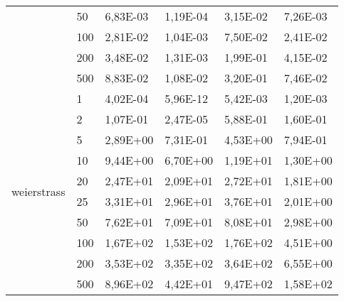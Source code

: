\begin{longtable}[c]{|p{3.5cm}|l|l|l|l|l|}
                                       & 50        & 6,83E-03 & 1,19E-04 & 3,15E-02 & 7,26E-03 \\ \cline{2-6} 
                                       & 100       & 2,81E-02 & 1,04E-03 & 7,50E-02 & 2,41E-02 \\ \cline{2-6} 
                                       & 200       & 3,48E-02 & 1,31E-03 & 1,99E-01 & 4,15E-02 \\ \cline{2-6} 
                                       & 500       & 8,83E-02 & 1,08E-02 & 3,20E-01 & 7,46E-02 \\ \hline
\multirow[t]{10}{*}{weierstrass}          & 1         & 4,02E-04 & 5,96E-12 & 5,42E-03 & 1,20E-03 \\ \cline{2-6} 
                                       & 2         & 1,07E-01 & 2,47E-05 & 5,88E-01 & 1,60E-01 \\ \cline{2-6} 
                                       & 5         & 2,89E+00 & 7,31E-01 & 4,53E+00 & 7,94E-01 \\ \cline{2-6} 
                                       & 10        & 9,44E+00 & 6,70E+00 & 1,19E+01 & 1,30E+00 \\ \cline{2-6} 
                                       & 20        & 2,47E+01 & 2,09E+01 & 2,72E+01 & 1,81E+00 \\ \cline{2-6} 
                                       & 25        & 3,31E+01 & 2,96E+01 & 3,76E+01 & 2,01E+00 \\ \cline{2-6} 
                                       & 50        & 7,62E+01 & 7,09E+01 & 8,08E+01 & 2,98E+00 \\ \cline{2-6} 
                                       & 100       & 1,67E+02 & 1,53E+02 & 1,76E+02 & 4,51E+00 \\ \cline{2-6} 
                                       & 200       & 3,53E+02 & 3,35E+02 & 3,64E+02 & 6,55E+00 \\ \cline{2-6} 
                                       & 500       & 8,96E+02 & 4,42E+01 & 9,47E+02 & 1,58E+02 \\ \hline
\end{longtable}

